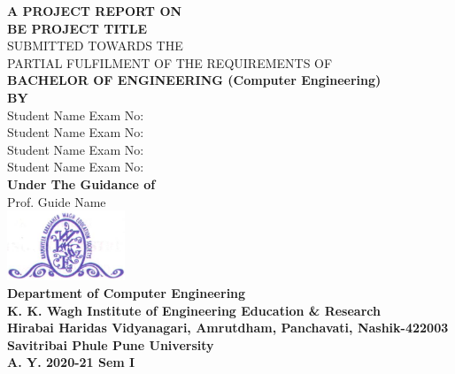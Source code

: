 \documentclass[oneside,a4paper,12pt]{report}
\begin{document}
\setlength{\parindent}{0mm}
\begin{center}
{\bfseries A  PROJECT REPORT ON \\}
 \vspace*{2\baselineskip}
{\bfseries \fontsize{16}{12} \selectfont BE PROJECT TITLE \\ \vspace*{2\baselineskip}}
{\fontsize{12}{12} \selectfont SUBMITTED TOWARDS THE
 \\PARTIAL FULFILMENT OF THE REQUIREMENTS OF \\

\vspace*{2\baselineskip}}
{\bfseries \fontsize{14}{12} \selectfont BACHELOR OF ENGINEERING (Computer
Engineering) \\
\vspace*{1\baselineskip}} 
{\bfseries \fontsize{14}{12} \selectfont BY \\ 
\vspace*{1\baselineskip}} 
Student Name  \hspace{25 mm} Exam No:  \\
Student Name \hspace{25 mm} Exam No:   \\
Student Name \hspace{25 mm} Exam No:  \\
Student Name \hspace{25 mm} Exam No:\\
\vspace*{2\baselineskip}
{\bfseries \fontsize{14}{12} \selectfont Under The Guidance of \\  
\vspace*{2\baselineskip}} 
Prof. Guide Name\\
\includegraphics[width=100pt]{collegelogo.png} \\
{\bfseries \fontsize{14}{12} \selectfont Department of Computer Engineering \\
K. K. Wagh Institute of Engineering Education \& Research \\
Hirabai Haridas Vidyanagari, Amrutdham, Panchavati, Nashik-422003 \\
Savitribai Phule Pune University\\
A. Y. 2020-21 Sem I
}
\end{center}
\end{document}
